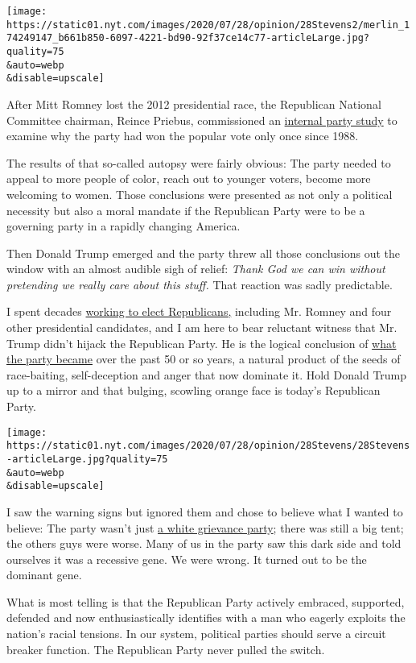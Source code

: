 \texttt{[image: https://static01.nyt.com/images/2020/07/28/opinion/28Stevens2/merlin\_174249147\_b661b850-6097-4221-bd90-92f37ce14c77-articleLarge.jpg?quality=75\\\&auto=webp\\\&disable=upscale]}

After Mitt Romney lost the 2012 presidential race, the Republican
National Committee chairman, Reince Priebus, commissioned an
\href{https://www.nytimes.com/2013/03/19/us/politics/republicans-plan-overhaul-for-2016-primary-season.html}{internal
party study} to examine why the party had won the popular vote only once
since 1988.

The results of that so-called autopsy were fairly obvious: The party
needed to appeal to more people of color, reach out to younger voters,
become more welcoming to women. Those conclusions were presented as not
only a political necessity but also a moral mandate if the Republican
Party were to be a governing party in a rapidly changing America.

Then Donald Trump emerged and the party threw all those conclusions out
the window with an almost audible sigh of relief: \emph{Thank God we can
win without pretending we really care about this stuff.} That reaction
was sadly predictable.

I spent decades
\href{https://www.nytimes.com/2020/07/16/us/politics/trump-republicans.html}{working
to elect Republicans,} including Mr. Romney and four other presidential
candidates, and I am here to bear reluctant witness that Mr. Trump
didn't hijack the Republican Party. He is the logical conclusion of
\href{https://www.nytimes.com/2020/03/18/opinion/trump-republicans-racism.html}{what
the party became} over the past 50 or so years, a natural product of the
seeds of race-baiting, self-deception and anger that now dominate it.
Hold Donald Trump up to a mirror and that bulging, scowling orange face
is today's Republican Party.

\texttt{[image: https://static01.nyt.com/images/2020/07/28/opinion/28Stevens/28Stevens-articleLarge.jpg?quality=75\\\&auto=webp\\\&disable=upscale]}

I saw the warning signs but ignored them and chose to believe what I
wanted to believe: The party wasn't just
\href{https://www.nytimes.com/2020/03/18/opinion/trump-republicans-racism.html}{a
white grievance party}; there was still a big tent; the others guys were
worse. Many of us in the party saw this dark side and told ourselves it
was a recessive gene. We were wrong. It turned out to be the dominant
gene.

What is most telling is that the Republican Party actively embraced,
supported, defended and now enthusiastically identifies with a man who
eagerly exploits the nation's racial tensions. In our system, political
parties should serve a circuit breaker function. The Republican Party
never pulled the switch.

